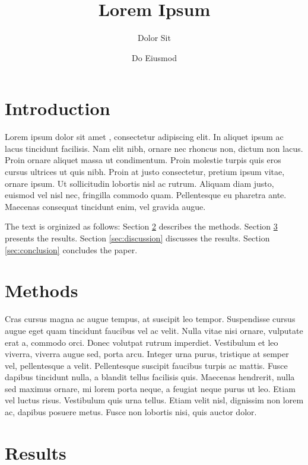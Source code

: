 \documentclass[12pt, aps, prb]{revtex4-2}
\begin{document}
\title{Lorem Ipsum}

\author{Dolor Sit}


\author{Do Eiusmod}

\maketitle

\section{Introduction}

Lorem ipsum dolor sit amet \cite{baroni2001}, consectetur adipiscing elit. In aliquet ipsum ac lacus tincidunt facilisis. Nam elit nibh, ornare nec rhoncus non, dictum non lacus. Proin ornare aliquet massa ut condimentum. Proin molestie turpis quis eros cursus ultrices ut quis nibh. Proin at justo consectetur, pretium ipsum vitae, ornare ipsum. Ut sollicitudin lobortis nisl ac rutrum. Aliquam diam justo, euismod vel nisl nec, fringilla commodo quam. Pellentesque eu pharetra ante. Maecenas consequat tincidunt enim, vel gravida augue.

The text is orginized as follows: Section \ref{sec:methods} describes the methods. Section \ref{sec:results} presents the results. Section \ref{sec:discussion} discusses the results. Section \ref{sec:conclusion} concludes the paper.

\section{Methods}
\label{sec:methods}

Cras cursus magna ac augue tempus, at suscipit leo tempor. Suspendisse cursus augue eget quam tincidunt faucibus vel ac velit. Nulla vitae nisi ornare, vulputate erat a, commodo orci. Donec volutpat rutrum imperdiet. Vestibulum et leo viverra, viverra augue sed, porta arcu. Integer urna purus, tristique at semper vel, pellentesque a velit. Pellentesque suscipit faucibus turpis ac mattis. Fusce dapibus tincidunt nulla, a blandit tellus facilisis quis. Maecenas hendrerit, nulla sed maximus ornare, mi lorem porta neque, a feugiat neque purus ut leo. Etiam vel luctus risus. Vestibulum quis urna tellus. Etiam velit nisl, dignissim non lorem ac, dapibus posuere metus. Fusce non lobortis nisi, quis auctor dolor.

\section{Results}
\label{sec:results}
\end{document}
